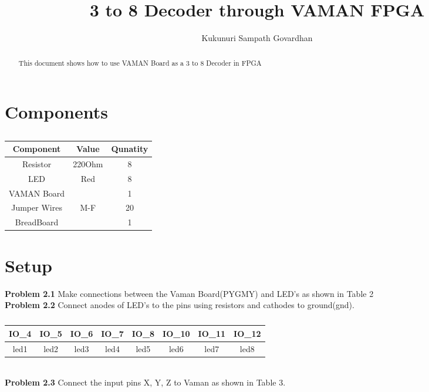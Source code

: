 \documentclass[journal,12pt,twocolumn]{IEEEtran}
\title{
3 to 8 Decoder through VAMAN FPGA
}
\author{Kukunuri Sampath Govardhan}
\begin{document}
\maketitle
\tableofcontents
\begin{abstract}
This document shows how to use VAMAN Board as a 3 to 8 Decoder in FPGA
\end{abstract}
\section{Components}
\begin{table}[h]
    \centering
    \begin{tabular}{| c | c | c |}
       \hline
       \textbf{Component}  &  \textbf{Value}  &  \textbf{Qunatity}\\
       \hline
         Resistor  &  220Ohm  &  8  \\
         \hline
         LED  &  Red  &  8  \\
         \hline
         VAMAN Board  &  & 1  \\
         \hline
         Jumper Wires  &  M-F  &  20  \\
         \hline
         BreadBoard  &    &  1\\
         \hline
         
    \end{tabular}
    \caption{}
    \label{tab:my_label}
\end{table}
\section{Setup}
\textbf{Problem 2.1} Make connections between the Vaman Board(PYGMY) and LED's as shown in Table 2 \\

\textbf{Problem 2.2} Connect anodes of LED's to the pins using resistors and cathodes to ground(gnd).\\
\begin{table}[h]
    \centering
    \begin{tabular}{| c | c | c | c | c | c | c | c |}
        \hline
         IO\_4 & IO\_5 & IO\_6 & IO\_7 & IO\_8 & IO\_10 & IO\_11 & IO\_12  \\
       \hline
       led1 & led2 & led3 & led4 & led5 & led6 & led7 & led8  \\
         \hline
    \end{tabular}
    \caption{}
    \label{tab:my_label}
\end{table}
\\
\textbf{Problem 2.3} Connect the input pins X, Y, Z to Vaman as shown in Table 3.\\
\end{document}
